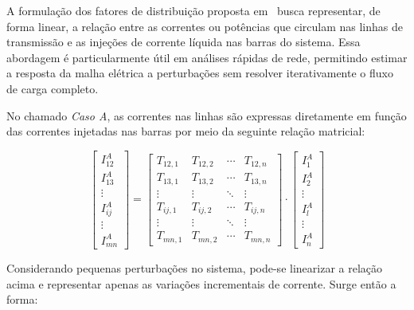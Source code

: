 \documentclass[journal]{IEEEtran}
\begin{document}
A formulação dos fatores de distribuição proposta em~\cite{ref1} busca representar, de forma linear, a relação entre as correntes ou potências que circulam nas linhas de transmissão e as injeções de corrente líquida nas barras do sistema. Essa abordagem é particularmente útil em análises rápidas de rede, permitindo estimar a resposta da malha elétrica a perturbações sem resolver iterativamente o fluxo de carga completo.

No chamado \textit{Caso A}, as correntes nas linhas são expressas diretamente em função das correntes injetadas nas barras por meio da seguinte relação matricial:

\begin{equation}
\begin{bmatrix}
I^{A}_{12} \\
I^{A}_{13} \\
\vdots \\
I^{A}_{ij} \\
\vdots \\
I^{A}_{mn}
\end{bmatrix}
=
\begin{bmatrix}
T_{12,1} & T_{12,2} & \cdots & T_{12,n} \\
T_{13,1} & T_{13,2} & \cdots & T_{13,n} \\
\vdots & \vdots & \ddots & \vdots \\
T_{ij,1} & T_{ij,2} & \cdots & T_{ij,n} \\
\vdots & \vdots & \ddots & \vdots \\
T_{mn,1} & T_{mn,2} & \cdots & T_{mn,n}
\end{bmatrix}
\cdot
\begin{bmatrix}
I^{A}_{1} \\
I^{A}_{2} \\
\vdots \\
I^{A}_{l} \\
\vdots \\
I^{A}_{n}
\end{bmatrix}
\label{eq:corrente_casoA}
\end{equation}

Considerando pequenas perturbações no sistema, pode-se linearizar a relação acima e representar apenas as variações incrementais de corrente. Surge então a forma:
\end{document}
